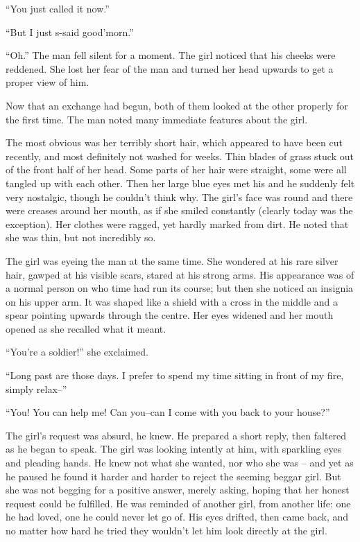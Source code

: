 ``You just called it now.''

``But I just s-said good'morn.''

``Oh.'' The man fell silent for a moment. The girl noticed that his cheeks were
reddened. She lost her fear of the man and turned her head upwards to get a
proper view of him.

Now that an exchange had begun, both of them looked at the other properly for
the first time. The man noted many immediate features about the girl.

The most obvious was her terribly short hair, which appeared to have been cut
recently, and most definitely not washed for weeks. Thin blades of grass stuck
out of the front half of her head. Some parts of her hair were straight, some
were all tangled up with each other. Then her large blue eyes met his and he
suddenly felt very nostalgic, though he couldn't think why. The girl's face was
round and there were creases around her mouth, as if she smiled constantly
(clearly today was the exception). Her clothes were ragged, yet hardly marked
from dirt. He noted that she was thin, but not incredibly so.

The girl was eyeing the man at the same time. She wondered at his rare silver
hair, gawped at his visible scars, stared at his strong arms. His appearance was
of a normal person on who time had run its course; but then she noticed an
insignia on his upper arm. It was shaped like a shield with a cross in the
middle and a spear pointing upwards through the centre. Her eyes widened and her
mouth opened as she recalled what it meant.

``You're a soldier!'' she exclaimed.

``Long past are those days. I prefer to spend my time sitting in front of my
fire, simply relax--''

``You! You can help me! Can you--can I come with you back to your house?''

The girl's request was absurd, he knew. He prepared a short reply, then faltered
as he began to speak. The girl was looking intently at him, with sparkling eyes
and pleading hands. He knew not what she wanted, nor who she was -- and yet as
he paused he found it harder and harder to reject the seeming beggar girl. But
she was not begging for a positive answer, merely asking, hoping that her honest
request could be fulfilled. He was reminded of another girl, from another life:
one he had loved, one he could never let go of. His eyes drifted, then came
back, and no matter how hard he tried they wouldn't let him look directly at the
girl.

